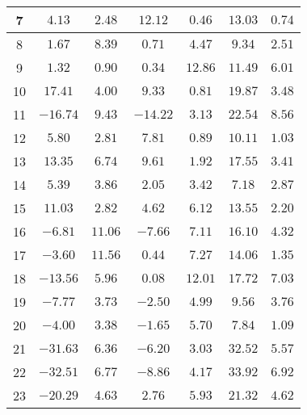 \begin{table}[H]
\begin{tabular}{|c|c|c|c|c|c|c|}
                        7   &   $4.13$    &  $2.48$   &   $12.12$   &  $0.46$  &  $13.03$   &  $0.74$   \\ \hline
                        8   &   $1.67$    &  $8.39$   &   $0.71$    &  $4.47$  &  $9.34$    &  $2.51$   \\ \hline
                        9   &   $1.32$    &  $0.90$   &   $0.34$    &  $12.86$ &  $11.49$   &  $6.01$   \\ \hline
                        10  &   $17.41$   &  $4.00$   &   $9.33$    &  $0.81$  &  $19.87$   &  $3.48$   \\ \hline
                        11  &   $-16.74$  &  $9.43$   &   $-14.22$  &  $3.13$  &  $22.54$   &  $8.56$   \\ \hline
                        12  &   $5.80$    &  $2.81$   &   $7.81$    &  $0.89$  &  $10.11$   &  $1.03$   \\ \hline
                        13  &   $13.35$   &  $6.74$   &   $9.61$    &  $1.92$  &  $17.55$   &  $3.41$   \\ \hline
                        14  &   $5.39$    &  $3.86$   &   $2.05$    &  $3.42$  &  $7.18$    &  $2.87$   \\ \hline
                        15  &   $11.03$   &  $2.82$   &   $4.62$    &  $6.12$  &  $13.55$   &  $2.20$   \\ \hline
                        16  &   $-6.81$   &  $11.06$  &   $-7.66$   &  $7.11$  &  $16.10$   &  $4.32$   \\ \hline
                        17  &   $-3.60$   &  $11.56$  &   $0.44$    &  $7.27$  &  $14.06$   &  $1.35$   \\ \hline
                        18  &   $-13.56$  &  $5.96$   &   $0.08$    &  $12.01$ &  $17.72$   &  $7.03$   \\ \hline
                        19  &   $-7.77$   &  $3.73$   &   $-2.50$   &  $4.99$  &  $9.56$    &  $3.76$   \\ \hline
                        20  &   $-4.00$   &  $3.38$   &   $-1.65$   &  $5.70$  &  $7.84$    &  $1.09$   \\ \hline
                        21  &   $-31.63$  &  $6.36$   &   $-6.20$   &  $3.03$  &  $32.52$   &  $5.57$   \\ \hline
                        22  &   $-32.51$  &  $6.77$   &   $-8.86$   &  $4.17$  &  $33.92$   &  $6.92$   \\ \hline
                        23  &   $-20.29$  &  $4.63$   &   $2.76$    &  $5.93$  &  $21.32$   &  $4.62$   \\ \hline

\end{tabular}
\end{table}
